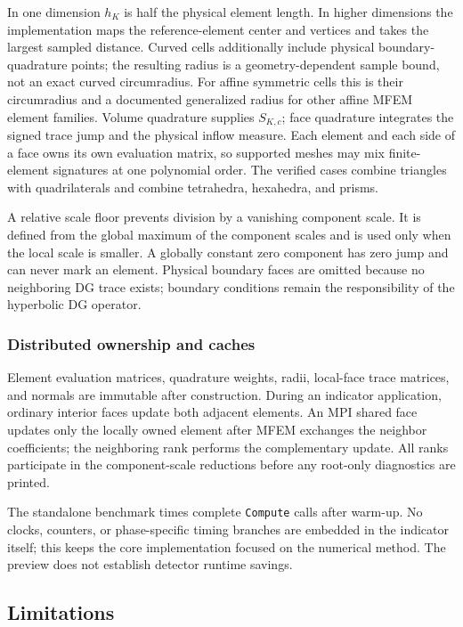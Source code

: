 In one dimension $h_K$ is half the physical element length.  In higher
dimensions the implementation maps the reference-element center and vertices
and takes the largest sampled distance. Curved cells additionally include physical boundary-quadrature points; the resulting radius is a geometry-dependent sample bound, not an exact curved circumradius.  For affine symmetric cells this is their circumradius and a documented generalized
radius for other affine MFEM element families.  Volume quadrature supplies
$S_{K,c}$; face quadrature integrates the signed trace jump and the physical
inflow measure.  Each element and each side of a face owns its own evaluation
matrix, so supported meshes may mix finite-element signatures at one polynomial
order.  The verified cases combine triangles with quadrilaterals and combine
tetrahedra, hexahedra, and prisms.

A relative scale floor prevents division by a vanishing component scale.  It is
defined from the global maximum of the component scales and is used only when
the local scale is smaller.  A globally constant zero component has zero jump
and can never mark an element.  Physical boundary faces are omitted because no
neighboring DG trace exists; boundary conditions remain the responsibility of
the hyperbolic DG operator.

\subsubsection{Distributed ownership and caches}

Element evaluation matrices, quadrature weights, radii, local-face trace
matrices, and normals are immutable after construction.  During an indicator
application, ordinary interior faces update both adjacent elements.  An MPI
shared face updates only the locally owned element after MFEM exchanges the
neighbor coefficients; the neighboring rank performs the complementary
update.  All ranks participate in the component-scale reductions before any
root-only diagnostics are printed.

The standalone benchmark times complete \texttt{Compute} calls after warm-up.
No clocks, counters, or phase-specific timing branches are embedded in the
indicator itself; this keeps the core implementation focused on the numerical
method. The preview does not establish detector runtime savings.

\subsection{Limitations}

